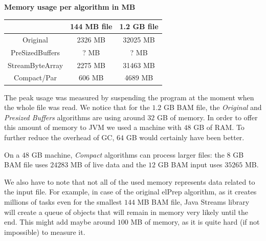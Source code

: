 \documentclass[a4paper,twoside]{article}
\begin{document}


\begin{small}
\begin{center}
\textbf{Memory usage per algorithm in MB} \\
	\begin{tabular}{|c|c|c|}
		\hline			  	& 144 MB file		& 1.2 GB file		\\ \hline
		Original			& 2326 MB			& 32025 MB			\\ \hline
		PreSizedBuffers		& ? MB				& ? MB				\\ \hline
		StreamByteArray 	& 2275 MB			& 31463 MB			\\ \hline
		Compact/Par			& 606 MB			& 4689 MB			\\ \hline
	\end{tabular}
\end{center}
\end{small}

The peak usage was measured by suspending the program at the moment when the whole file was read.
We notice that for the $1.2$ GB BAM file, the {\it Original} and {\it Presized Buffers} algorithms are using around $32$ GB of memory. In order to offer this amount of memory to JVM we used a machine with $48$ GB of RAM. To further reduce the overhead of GC, $64$ GB would certainly have been better.


On a $48$ GB machine, {\it Compact} algorithms can process larger files: the $8$ GB BAM file uses $24283$ MB of live data and the $12$ GB BAM input uses $35 265$ MB.


We also have to note that not all of the used memory represents data related to the input file.
For example, in case of the original elPrep algorithm, as it creates millions of tasks even for the smallest $144$ MB BAM file, Java Streams library will create a queue of objects that will remain in memory very likely until the end. This might add maybe around $100$ MB of memory, as it is quite hard (if not impossible) to measure it.
\end{document}
